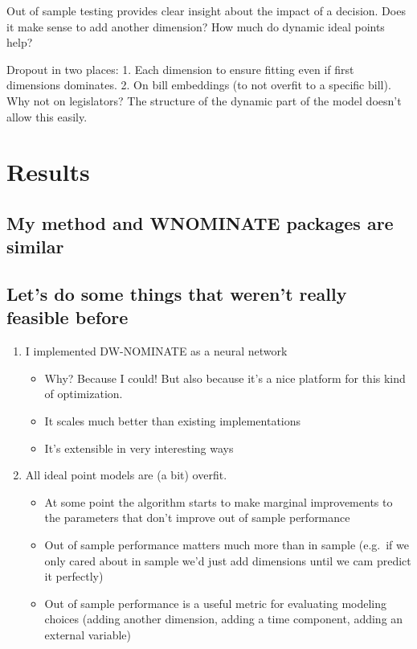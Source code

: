 \documentclass[11pt,]{article}
\providecommand{\tightlist}{%
\setlength{\itemsep}{0pt}\setlength{\parskip}{0pt}}
\begin{document}
Out of sample testing provides clear insight about the impact of a
decision. Does it make sense to add another dimension? How much do
dynamic ideal points help?

Dropout in two places: 1. Each dimension to ensure fitting even if first
dimensions dominates. 2. On bill embeddings (to not overfit to a
specific bill). Why not on legislators? The structure of the dynamic
part of the model doesn't allow this easily.

\section{Results}\label{results}

\subsection{My method and WNOMINATE packages are
similar}\label{my-method-and-wnominate-packages-are-similar}

\subsection{Let's do some things that weren't really feasible
before}\label{lets-do-some-things-that-werent-really-feasible-before}

\begin{enumerate}
\def\labelenumi{\arabic{enumi}.}
\tightlist
\item
  I implemented DW-NOMINATE as a neural network

  \begin{itemize}
  \tightlist
  \item
    Why? Because I could! But also because it's a nice platform for this
    kind of optimization.
  \item
    It scales much better than existing implementations
  \item
    It's extensible in very interesting ways
  \end{itemize}
\item
  All ideal point models are (a bit) overfit.

  \begin{itemize}
  \tightlist
  \item
    At some point the algorithm starts to make marginal improvements to
    the parameters that don't improve out of sample performance
  \item
    Out of sample performance matters much more than in sample (e.g.~if
    we only cared about in sample we'd just add dimensions until we cam
    predict it perfectly)
  \item
    Out of sample performance is a useful metric for evaluating modeling
    choices (adding another dimension, adding a time component, adding
    an external variable)
  \end{itemize}
\end{enumerate}
\end{document}

